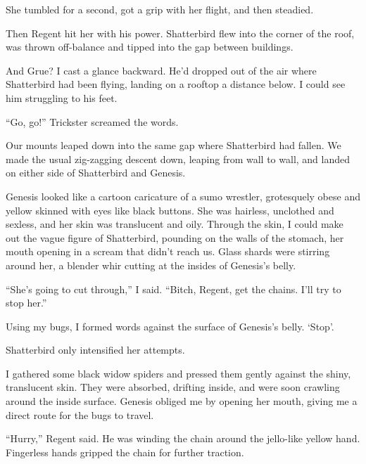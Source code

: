 She tumbled for a second, got a grip with her flight, and then steadied.



Then Regent hit her with his power.  Shatterbird flew into the corner of the roof, was thrown off-balance and tipped into the gap between buildings.



And Grue?  I cast a glance backward.  He'd dropped out of the air where Shatterbird had been flying, landing on a rooftop a distance below.  I could see him struggling to his feet.



``Go, go!''  Trickster screamed the words.



Our mounts leaped down into the same gap where Shatterbird had fallen.  We made the usual zig-zagging descent down, leaping from wall to wall, and landed on either side of Shatterbird and Genesis.



Genesis looked like a cartoon caricature of a sumo wrestler, grotesquely obese and yellow skinned with eyes like black buttons.  She was hairless, unclothed and sexless, and her skin was translucent and oily.  Through the skin, I could make out the vague figure of Shatterbird, pounding on the walls of the stomach, her mouth opening in a scream that didn't reach us.  Glass shards were stirring around her, a blender whir cutting at the insides of Genesis's belly.



``She's going to cut through,'' I said.  ``Bitch, Regent, get the chains.  I'll try to stop her.''



Using my bugs, I formed words against the surface of Genesis's belly.  `Stop'.



Shatterbird only intensified her attempts.



I gathered some black widow spiders and pressed them gently against the shiny, translucent skin.  They were absorbed, drifting inside, and were soon crawling around the inside surface.  Genesis obliged me by opening her mouth, giving me a direct route for the bugs to travel.



``Hurry,'' Regent said.  He was winding the chain around the jello-like yellow hand.  Fingerless hands gripped the chain for further traction.



